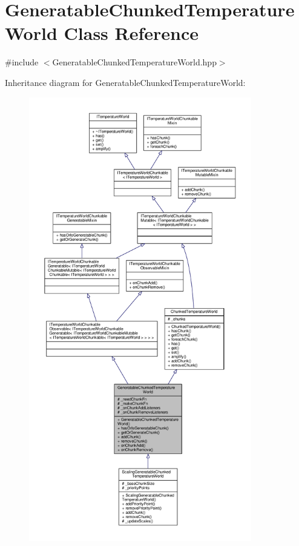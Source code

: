 \hypertarget{class_generatable_chunked_temperature_world}{\section{Generatable\-Chunked\-Temperature\-World Class Reference}
\label{class_generatable_chunked_temperature_world}
}


{\ttfamily \#include $<$Generatable\-Chunked\-Temperature\-World.\-hpp$>$}



Inheritance diagram for Generatable\-Chunked\-Temperature\-World\-:
\nopagebreak
\begin{figure}[H]
\begin{center}
\leavevmode
\includegraphics[height=550pt]{class_generatable_chunked_temperature_world__inherit__graph}
\end{center}
\end{figure}


